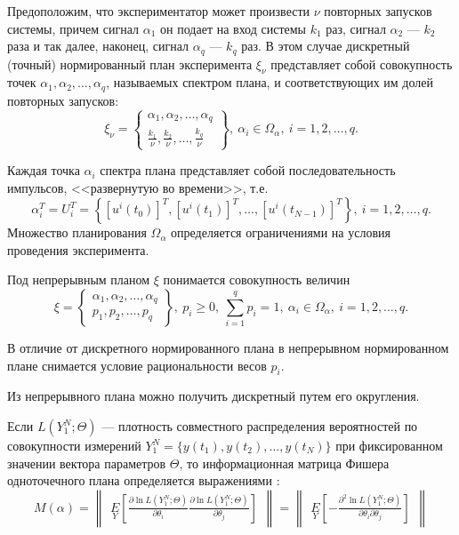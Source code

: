 \documentclass[a4paper,14pt]{extarticle}
\begin{document}
Предоположим, что экспериментатор может произвести $\nu$ повторных запусков
системы, причем сигнал $\alpha_1$ он подает на вход системы $k_1$ раз, сигнал
$\alpha_2$ --- $k_2$ раза и так далее, наконец, сигнал $\alpha_q$ --- $k_q$
раз. В этом случае дискретный (точный) нормированный план эксперимента
$\xi_{\nu}$ представляет собой совокупность точек $\alpha_1, \alpha_2, \ldots,
\alpha_q$, называемых спектром плана, и соответствующих им долей повторных
запусков:
\begin{equation*}
	\xi_{\nu} = \left\{
		\begin{array}{cc} 
			\alpha_1, \alpha_2, \ldots, \alpha_q \\
			\frac{k_1}{\nu}, \frac{k_2}{\nu}, \ldots, \frac{k_q}{\nu}
		\end{array} \right\},\ \alpha_i \in \Omega_{\alpha},\ i = 1, 2, \ldots, q.
\end{equation*}

Каждая точка $\alpha_i$ спектра плана представляет собой последовательность
импульсов, <<развернутую во времени>>, т.е.
\[
	\alpha_i^T = U_i^T = \left\{ [u^i(t_0)]^T, [u^i(t_1)]^T, \ldots,
	[u^i(t_{N-1})]^T \right\},\ i = 1, 2, \ldots, q.
\]
Множество планирования $\Omega_{\alpha}$ определяется ограничениями на условия
проведения эксперимента.

Под непрерывным планом $\xi$ понимается совокупность величин
\begin{equation*}
	\xi = \left\{
		\begin{array}{cc} 
			\alpha_1, \alpha_2, \ldots, \alpha_q \\
			p_1, p_2, \ldots, p_q	
		\end{array} \right\},\ 
	p_i \ge 0,\ \sum\limits_{i=1}^q p_i = 1,\ \alpha_i \in \Omega_{\alpha},\ i = 1, 2, \ldots, q.
\end{equation*}

В отличие от дискретного нормированного плана в непрерывном нормированном плане
снимается условие рациональности весов $p_i$.

Из непрерывного плана можно получить дискретный путем его округления.

Если $L(Y_1^N; \Theta)$ --- плотность совместного распределения вероятностей по
совокупности измерений $Y_1^N = \{ y(t_1), y(t_2), \ldots, y(t_N) \}$ при
фиксированном значении вектора параметров $\Theta$, то информационная матрица
Фишера одноточечного плана определяется выражениями \cite{mono}:
\begin{equation*}
	M(\alpha) = 
	\begin{Vmatrix} 
		\underset{Y}{E}
		\left[ 
			\frac{\partial \ln L(Y_1^N; \Theta)}{\partial \theta_i}
			\frac{\partial \ln L(Y_1^N; \Theta)}{\partial \theta_j}
		\right]
	\end{Vmatrix} =
	\begin{Vmatrix} 
		\underset{Y}{E}
		\left[ 
			-\frac{\partial^2 \ln L(Y_1^N; \Theta)}
			{\partial \theta_i \partial \theta_j}
		\right]
	\end{Vmatrix}
\end{equation*}
\end{document}
